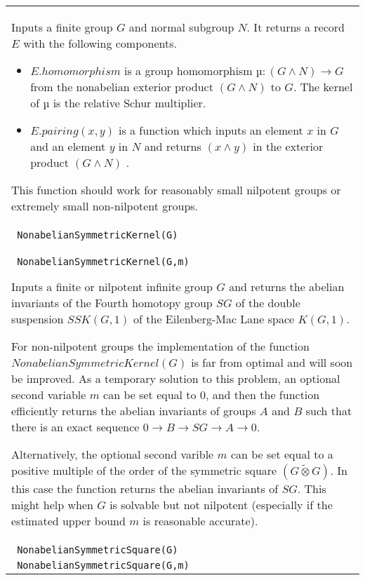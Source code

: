 \documentclass[a4paper,11pt]{report}
\begin{document}
{\begin{center}
\begin{tabular}{|l|}
 Inputs a finite group $G$ and normal subgroup $N$. It returns a record $E$ with the following components. 
\begin{itemize}
\item  $E.homomorphism$ is a group homomorphism $µ : (G \wedge N) \longrightarrow G$ from the nonabelian exterior product $(G \wedge N)$ to $G$. The kernel of $µ$ is the relative Schur multiplier. 
\item  $E.pairing(x,y)$ is a function which inputs an element $x$ in $G$ and an element $y$ in $N$ and returns $(x \wedge y)$ in the exterior product $(G \wedge N)$ . 
\end{itemize}
 This function should work for reasonably small nilpotent groups or extremely
small non-nilpotent groups. \\
 \index{NonabelianSymmetricKernel} \texttt{ NonabelianSymmetricKernel(G) } \\
 \texttt{ NonabelianSymmetricKernel(G,m) } 

 Inputs a finite or nilpotent infinite group $G$ and returns the abelian invariants of the Fourth homotopy group $SG$ of the double suspension $SSK(G,1)$ of the Eilenberg-Mac Lane space $K(G,1)$. 

 For non-nilpotent groups the implementation of the function $NonabelianSymmetricKernel(G)$ is far from optimal and will soon be improved. As a temporary solution to this
problem, an optional second variable $m$ can be set equal to $0$, and then the function efficiently returns the abelian invariants of groups $A$ and $B$ such that there is an exact sequence $0 \longrightarrow B \longrightarrow SG \longrightarrow A \longrightarrow 0$. 

 Alternatively, the optional second varible $m$ can be set equal to a positive multiple of the order of the symmetric square $(G \tilde\otimes G)$. In this case the function returns the abelian invariants of $SG$. This might help when $G$ is solvable but not nilpotent (especially if the estimated upper bound $m$ is reasonable accurate). \\
 \index{NonabelianSymmetricSquare} \texttt{ NonabelianSymmetricSquare(G) } \\
 \texttt{ NonabelianSymmetricSquare(G,m) } 


\end{tabular}
\end{center}}
\end{document}
